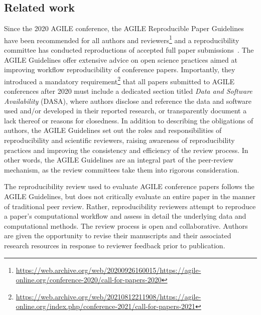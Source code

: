 \documentclass{josis}
\begin{document}
\subsection{Related work}
\label{sec:related}

Since the 2020 AGILE conference, the AGILE Reproducible Paper Guidelines~\cite{nust2020_guidelines} have been recommended for all authors and reviewers\footnote{\url{https://web.archive.org/web/20200926160015/https://agile-online.org/conference-2020/call-for-papers-2020}}
and a reproducibility committee has conducted reproductions of accepted full paper submissions~\cite{nust2020improving}. 
The AGILE Guidelines offer extensive advice on open science practices aimed at improving workflow reproducibility of conference papers. 
Importantly, they introduced a mandatory requirement\footnote{\url{https://web.archive.org/web/20210812211908/https://agile-online.org/index.php/conference-2021/call-for-papers-2021}}
that all papers submitted to AGILE conferences after 2020 must include a dedicated section titled \textit{Data and Software Availability} (DASA), where authors disclose and reference the data and software used and/or developed in their reported research, or transparently document a lack thereof or reasons for closedness. 
In addition to describing the obligations of authors, the AGILE Guidelines set out the roles and responsibilities of reproducibility and scientific reviewers,
raising awareness of reproducibility practices and improving the consistency and efficiency of the review process. In other words, the AGILE Guidelines are an integral part of the peer-review mechanism, as the review committees take them into rigorous consideration.

The reproducibility review used to evaluate AGILE conference papers follows the AGILE Guidelines, but does not critically evaluate an entire paper in the manner of traditional peer review. 
Rather, reproducibility reviewers attempt to reproduce a paper's computational workflow and assess in detail the underlying data and computational methods. 
The review process is open and collaborative. 
Authors are given the opportunity to revise their manuscripts and their associated research resources in response to reviewer feedback prior to publication.
\end{document}
